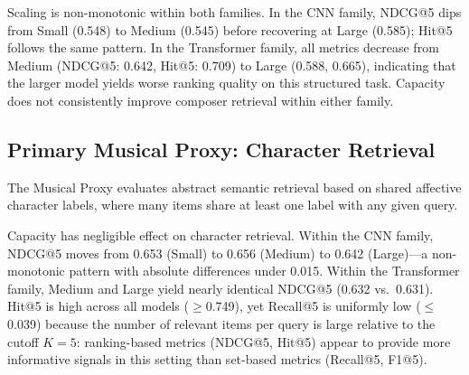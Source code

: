 \documentclass[sigconf]{acmart}
\begin{document}
Scaling is non-monotonic within both families. In the CNN family, NDCG@5 dips from Small (0.548) to Medium (0.545) before recovering at Large (0.585); Hit@5 follows the same pattern. In the Transformer family, all metrics decrease from Medium (NDCG@5: 0.642, Hit@5: 0.709) to Large (0.588, 0.665), indicating that the larger model yields worse ranking quality on this structured task. Capacity does not consistently improve composer retrieval within either family.

\subsection{Primary Musical Proxy: Character Retrieval}

The Musical Proxy evaluates abstract semantic retrieval based on shared affective character labels, where many items share at least one label with any given query.

\begin{table}[!htbp]
\centering
\caption{Primary Musical Proxy Results (Character Retrieval). Metrics reported are corpus-level mean values at rank 5.}
\label{tab:musical_results}
\end{table}

Capacity has negligible effect on character retrieval. Within the CNN family, NDCG@5 moves from 0.653 (Small) to 0.656 (Medium) to 0.642 (Large)---a non-monotonic pattern with absolute differences under 0.015. Within the Transformer family, Medium and Large yield nearly identical NDCG@5 (0.632 vs.\ 0.631). Hit@5 is high across all models ($\geq$0.749), yet Recall@5 is uniformly low ($\leq$0.039) because the number of relevant items per query is large relative to the cutoff $K{=}5$: ranking-based metrics (NDCG@5, Hit@5) appear to provide more informative signals in this setting than set-based metrics (Recall@5, F1@5).
\end{document}

